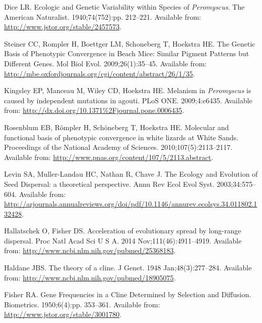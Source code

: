 \documentclass[10pt,letterpaper]{article}
\begin{document}
\begin{thebibliography}{10}
Dice LR.
\newblock Ecologic and Genetic Variability within Species of
  \textit{{Peromyscus}}.
\newblock The American Naturalist. 1940;74(752):pp. 212--221.
\newblock Available from: \url{http://www.jstor.org/stable/2457573}.

Steiner CC, Rompler H, Boettger LM, Schoneberg T, Hoekstra HE.
\newblock The Genetic Basis of Phenotypic Convergence in Beach Mice: Similar
  Pigment Patterns but Different Genes.
\newblock Mol Biol Evol. 2009;26(1):35--45.
\newblock Available from:
  \url{http://mbe.oxfordjournals.org/cgi/content/abstract/26/1/35}.

Kingsley EP, Manceau M, Wiley CD, Hoekstra HE.
\newblock Melanism in \textit{{Peromyscus}} is caused by independent mutations
  in agouti.
\newblock PLoS ONE. 2009;4:e6435.
\newblock Available from:
  \url{http://dx.doi.org/10.1371%2Fjournal.pone.0006435}.

Rosenblum EB, Römpler H, Schöneberg T, Hoekstra HE.
\newblock Molecular and functional basis of phenotypic convergence in white
  lizards at {W}hite {S}ands.
\newblock Proceedings of the National Academy of Sciences.
  2010;107(5):2113--2117.
\newblock Available from:
  \url{http://www.pnas.org/content/107/5/2113.abstract}.

Levin SA, Muller-Landau HC, Nathan R, Chave J.
\newblock The Ecology and Evolution of Seed Dispersal: a theoretical
  perspective.
\newblock Annu Rev Ecol Evol Syst. 2003;34:575--604.
\newblock Available from:
  \url{http://arjournals.annualreviews.org/doi/pdf/10.1146/annurev.ecolsys.34.011802.132428}.

Hallatschek O, Fisher DS.
\newblock Acceleration of evolutionary spread by long-range dispersal.
\newblock Proc Natl Acad Sci U S A. 2014 Nov;111(46):4911--4919.
\newblock Available from: \url{http://www.ncbi.nlm.nih.gov/pubmed/25368183}.

Haldane JBS.
\newblock The theory of a cline.
\newblock J Genet. 1948 Jan;48(3):277--284.
\newblock Available from: \url{http://www.ncbi.nlm.nih.gov/pubmed/18905075}.

Fisher RA.
\newblock Gene Frequencies in a Cline Determined by Selection and Diffusion.
\newblock Biometrics. 1950;6(4):pp. 353--361.
\newblock Available from: \url{http://www.jstor.org/stable/3001780}.


\end{thebibliography}
\end{document}
